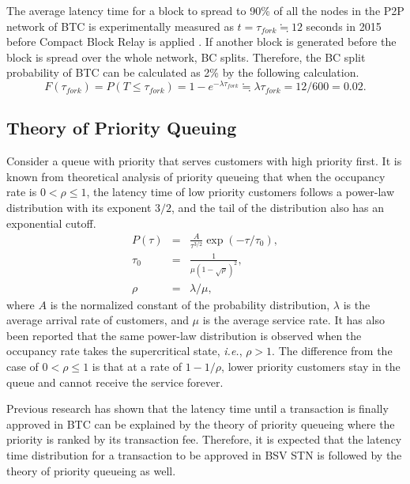 \documentclass[graybox]{svmult}
\begin{document}
The average latency time for a block to spread to 90\% of all the nodes in the P2P network of BTC is experimentally measured as $t = \tau_{fork} \fallingdotseq 12$ seconds in 2015 before Compact Block Relay is applied \cite{bloX}. 
If another block is generated before the block is spread over the whole network, BC splits. 
Therefore, the BC split probability of BTC can be calculated as 2\% by the following calculation. 
%
\begin{equation}
  F(\tau_{fork}) = P(T \le \tau_{fork}) = 1 - e^{-\lambda \tau_{fork}} \fallingdotseq \lambda \tau_{fork} = 12/600 = 0.02. 
\end{equation}
%



\subsection{Theory of Priority Queuing}
\label{sec:priorityqueue}

Consider a queue with priority that serves customers with high priority first. 
It is known from theoretical analysis of priority queueing that when the occupancy rate is $0 < \rho \le1 $, the latency time of low priority customers follows a power-law distribution with its exponent $3/2$, and the tail of the distribution also has an exponential cutoff\cite{OB2005}. 
%
\begin{eqnarray}
  P(\tau) &=& \frac{A}{\tau^{3/2}} \exp(-\tau/\tau_0), \\
  \tau_0  &=& \frac{1}{\mu (1-\sqrt{\rho})^2}, \\
  \rho    &=& \lambda / \mu,
\end{eqnarray}
%
where $A$ is the normalized constant of the probability distribution, $\lambda$ is the average arrival rate of customers, and $\mu$ is the average service rate.
It has also been reported that the same power-law distribution is observed when the occupancy rate takes the supercritical state, \textit{i.e.}, $\rho > 1$. 
The difference from the case of $0 < \rho \le 1$ is that at a rate of $1 -1 / \rho $, lower priority customers stay in the queue and cannot receive the service forever. 

Previous research\cite{KK2019} has shown that the latency time until a transaction is finally approved in BTC can be explained by the theory of priority queueing where the priority is ranked by its transaction fee.
Therefore, it is expected that the latency time distribution for a transaction to be approved in BSV STN is followed by the theory of priority queueing as well. 
\end{document}
